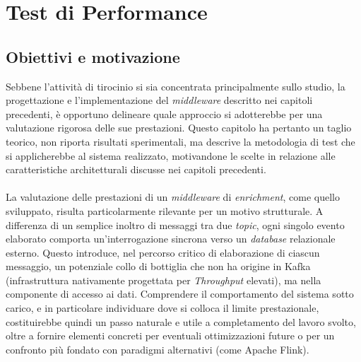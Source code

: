 \chapter{Test di Performance}
\label{Test di Performance}

\section{Obiettivi e motivazione}
Sebbene l'attività di tirocinio si sia concentrata principalmente sullo studio, la progettazione e l'implementazione del \textit{middleware} descritto nei capitoli precedenti, è opportuno delineare quale approccio si adotterebbe per una valutazione rigorosa delle sue prestazioni. 
Questo capitolo ha pertanto un taglio teorico, non riporta risultati sperimentali, ma descrive la metodologia di test che si applicherebbe al sistema realizzato, motivandone le scelte in relazione alle caratteristiche architetturali discusse nei capitoli precedenti. \\ \\
La valutazione delle prestazioni di un \textit{middleware} di \textit{enrichment}, come quello sviluppato, risulta particolarmente rilevante per un motivo strutturale. 
A differenza di un semplice inoltro di messaggi tra due \textit{topic}, ogni singolo evento elaborato comporta un'interrogazione sincrona verso un \textit{database} relazionale esterno. Questo introduce, nel percorso critico di elaborazione di ciascun messaggio, un potenziale collo di bottiglia che non ha origine in Kafka (infrastruttura nativamente progettata per \textit{\gls{Throughput}} elevati), ma nella componente di accesso ai dati. 
Comprendere il comportamento del sistema sotto carico, e in particolare individuare dove si colloca il limite prestazionale, costituirebbe quindi un passo naturale e utile a completamento del lavoro svolto, oltre a fornire elementi concreti per eventuali ottimizzazioni future o per un confronto più fondato con paradigmi alternativi (come Apache Flink).

